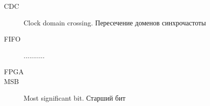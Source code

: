 \Abbreviations %
\begin{description}
\item [CDC] Clock domain crossing. Пересечение доменов синхрочастоты
\item [FIFO] ...........
\item [FPGA]
\item [MSB] Most significant bit. Старший бит
\end{description}

